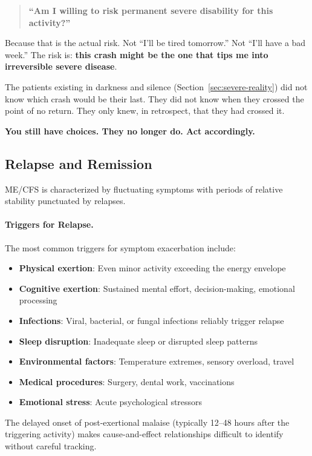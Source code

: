 \begin{keypoint}
\begin{quote}
\textbf{``Am I willing to risk permanent severe disability for this activity?''}
\end{quote}

Because that is the actual risk. Not ``I'll be tired tomorrow.'' Not ``I'll have a bad week.'' The risk is: \textbf{this crash might be the one that tips me into irreversible severe disease}.

The patients existing in darkness and silence (Section~\ref{sec:severe-reality}) did not know which crash would be their last. They did not know when they crossed the point of no return. They only knew, in retrospect, that they had crossed it.

\textbf{You still have choices. They no longer do. Act accordingly.}
\end{keypoint}

\subsection{Relapse and Remission}

ME/CFS is characterized by fluctuating symptoms with periods of relative stability punctuated by relapses.

\paragraph{Triggers for Relapse.}
The most common triggers for symptom exacerbation include:
\begin{itemize}
    \item \textbf{Physical exertion}: Even minor activity exceeding the energy envelope
    \item \textbf{Cognitive exertion}: Sustained mental effort, decision-making, emotional processing
    \item \textbf{Infections}: Viral, bacterial, or fungal infections reliably trigger relapse
    \item \textbf{Sleep disruption}: Inadequate sleep or disrupted sleep patterns
    \item \textbf{Environmental factors}: Temperature extremes, sensory overload, travel
    \item \textbf{Medical procedures}: Surgery, dental work, vaccinations
    \item \textbf{Emotional stress}: Acute psychological stressors
\end{itemize}

The delayed onset of post-exertional malaise (typically 12--48 hours after the triggering activity) makes cause-and-effect relationships difficult to identify without careful tracking.

